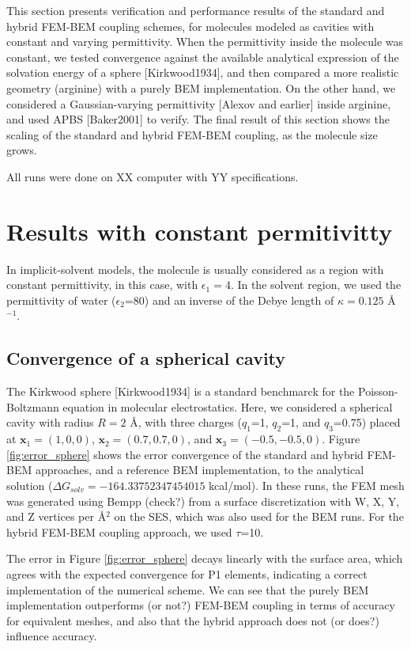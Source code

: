 This section presents verification and performance results of the standard and hybrid FEM-BEM coupling schemes, for molecules modeled as cavities with constant and varying permittivity.
When the permittivity inside the molecule was constant, we tested convergence against the available analytical expression of the solvation energy of a sphere [Kirkwood1934], and then compared a more realistic geometry (arginine) with a purely BEM implementation.
On the other hand, we considered a Gaussian-varying permittivity [Alexov and earlier] inside arginine, and used APBS [Baker2001] to verify.
The final result of this section shows the scaling of the standard and hybrid FEM-BEM coupling, as the molecule size grows. 

All runs were done on XX computer with YY specifications. 

\section*{\sffamily \Large Results with constant permitivitty}

In implicit-solvent models, the molecule is usually considered as a region with constant permittivity, in this case, with $\epsilon_1=4$.
In the solvent region, we used the permittivity of water ($\epsilon_2$=80) and an inverse of the Debye length of $\kappa=0.125$ \AA$^{-1}$.

\subsection*{\sffamily \large Convergence of a spherical cavity}

The Kirkwood sphere [Kirkwood1934] is a standard benchmarck for the Poisson-Boltzmann equation in molecular electrostatics. 
Here, we considered a spherical cavity with radius $R=2$ \AA, with three charges ($q_1$=1, $q_2$=1, and $q_3$=0.75) placed at $\mathbf{x}_1=(1,0,0)$, $\mathbf{x}_2=(0.7,0.7,0)$, and $\mathbf{x}_3=(-0.5,-0.5,0)$.
Figure \ref{fig:error_sphere} shows the error convergence of the standard and hybrid FEM-BEM approaches, and a reference BEM implementation, to the analytical solution ($\Delta G_{solv}= -164.33752347454015$ kcal/mol). 
In these runs, the FEM mesh was generated using Bempp (check?) from a surface discretization with W, X, Y, and Z vertices per \AA$^2$ on the SES, which was also used for the BEM runs. 
For the hybrid FEM-BEM coupling approach, we used $\tau$=10.

The error in Figure \ref{fig:error_sphere} decays linearly with the surface area, which agrees with the expected convergence for P1 elements, indicating a correct implementation of the numerical scheme. 
We can see that the purely BEM implementation outperforms (or not?) FEM-BEM coupling in terms of accuracy for equivalent meshes, and also that the hybrid approach does not (or does?) influence accuracy. 

